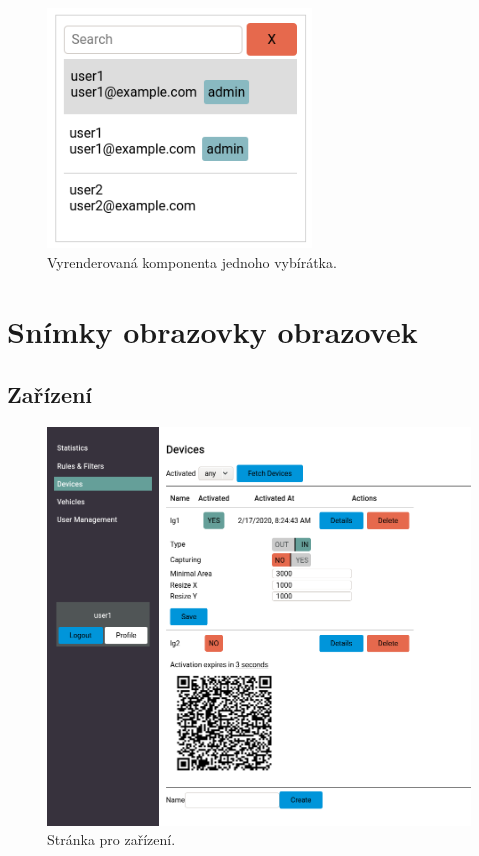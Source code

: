 \begin{figure}[!htb] \centering
  \includegraphics[width=70mm]{../img/picker_component.png}
  \caption{Vyrenderovaná komponenta jednoho vybírátka.}
  \label{fig:picker_component}
\end{figure}


\section{Snímky obrazovky obrazovek} \label{screens}

\subsection*{Zařízení}

\begin{figure}[!htb] \centering
  \includegraphics[width=145mm]{../img/page_devices.png}
  \caption{Stránka pro zařízení.}
  \label{fig:page_devices}
\end{figure}

